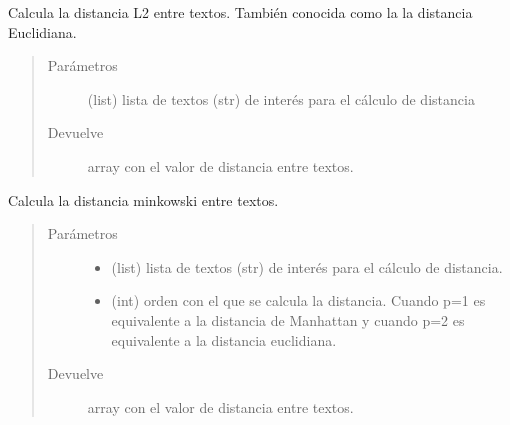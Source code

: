 \documentclass[letterpaper,10pt,openany,spanish]{sphinxmanual}
\begin{document}
\begin{fulllineitems}
\begin{fulllineitems}
\label{\detokenize{funciones/comparacion:comparacion.Distancia.l2}}
Calcula la distancia L2 entre textos. También conocida como la 
la distancia Euclidiana.
\begin{quote}\begin{description}
\item[{Parámetros}] \leavevmode
{} \textendash{} (list) lista de textos (str) de interés para el 
cálculo de distancia

\item[{Devuelve}] \leavevmode
array con el valor de distancia entre textos.

\end{description}\end{quote}

\end{fulllineitems}


\begin{fulllineitems}
\label{\detokenize{funciones/comparacion:comparacion.Distancia.minkowski}}
Calcula la distancia minkowski entre textos.
\begin{quote}\begin{description}
\item[{Parámetros}] \leavevmode\begin{itemize}
\item {} 
 \textendash{} (list) lista de textos (str) de interés para el 
cálculo de distancia.

\item {} 
 \textendash{} (int) orden con el que se calcula la distancia.  
Cuando p=1 es equivalente a la distancia de Manhattan  
y cuando p=2 es equivalente a la distancia euclidiana.

\end{itemize}

\item[{Devuelve}] \leavevmode
array con el valor de distancia entre textos.

\end{description}\end{quote}

\end{fulllineitems}


\end{fulllineitems}
\end{document}
